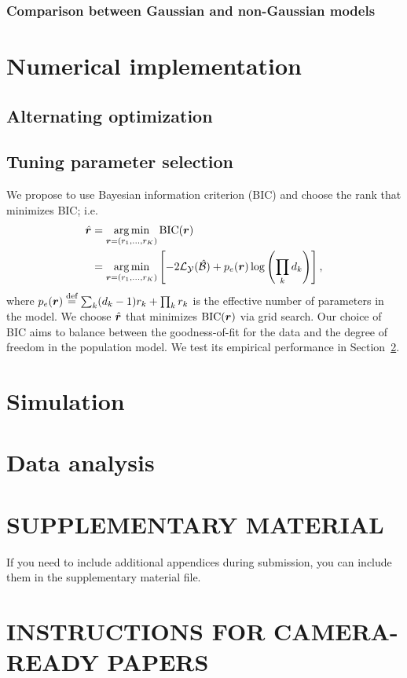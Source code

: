 \documentclass[twoside]{article}
\theoremstyle{plain}
\theoremstyle{definition}
\begin{document}
\subsubsection{Comparison between Gaussian and non-Gaussian models}

\section{Numerical implementation}
\subsection{Alternating optimization}
\subsection{Tuning parameter selection}\label{sec:tuning}
We propose to use Bayesian information criterion (BIC) and choose the rank that minimizes BIC; i.e.
\begin{align}
\hat {\bm{r}}&=\operatorname*{arg\,min}_{\bm{r}=(r_1,\ldots,r_K)} \text{BIC}(\bm{r})\\
&=\operatorname*{arg\,min}_{\bm{r}=(r_1,\ldots,r_K)}\left[-2\mathcal{L}_{\mathcal{Y}}(\hat {\mathcal{B}})+p_e(\bm{r})\log \left(\prod_k d_k\right) \right],
\end{align}
where $p_e(\bm{r})\stackrel{\text{def}}{=}\sum_k (d_k-1)r_k+\prod_k r_k$ is the effective number of parameters in the model. We choose $\hat {\bm{r}}$ that minimizes $\text{BIC}(\bm{r})$ via grid search. Our choice of BIC aims to balance between the goodness-of-fit for the data and the degree of freedom in the population model. We test its empirical performance in Section~\ref{sec:simulation}.  

\section{Simulation}\label{sec:simulation}
\section{Data analysis}
\section{SUPPLEMENTARY MATERIAL}

If you need to include additional appendices during submission, you
can include them in the supplementary material file.



\section{INSTRUCTIONS FOR CAMERA-READY PAPERS}
\end{document}
